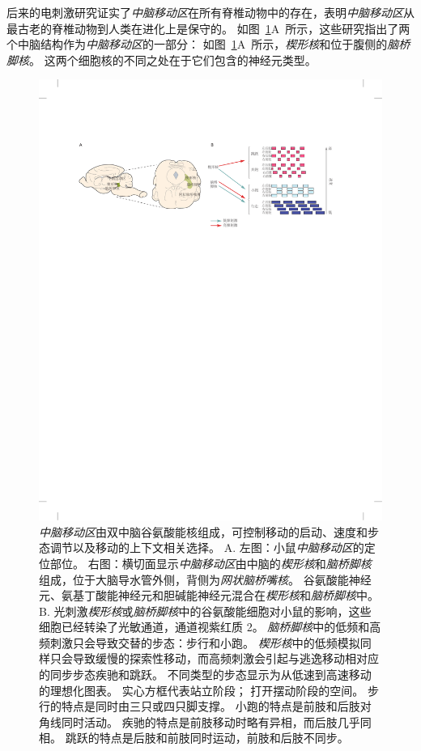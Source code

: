 后来的电刺激研究证实了\textit{中脑移动区}在所有脊椎动物中的存在，表明\textit{中脑移动区}从最古老的脊椎动物到人类在进化上是保守的。
如图~\ref{fig:33_11}A~所示，这些研究指出了两个中脑结构作为\textit{中脑移动区}的一部分：
如图~\ref{fig:33_11}A~所示，\textit{楔形核}和位于腹侧的\textit{脑桥脚核}。
这两个细胞核的不同之处在于它们包含的神经元类型。


\begin{figure}[htbp]
	\centering
	\includegraphics[width=1.0\linewidth]{chap33/fig_33_11}
	\caption{\textit{中脑移动区}由双中脑谷氨酸能核组成，可控制移动的启动、速度和步态调节以及移动的上下文相关选择。
		A. 左图：小鼠\textit{中脑移动区}的定位部位。
		右图：横切面显示\textit{中脑移动区}由中脑的\textit{楔形核}和\textit{脑桥脚核}组成，位于大脑导水管外侧，背侧为\textit{网状脑桥嘴核}。
		谷氨酸能神经元、氨基丁酸能神经元和胆碱能神经元混合在\textit{楔形核}和\textit{脑桥脚核}中。
		B. 光刺激\textit{楔形核}或\textit{脑桥脚核}中的谷氨酸能细胞对小鼠的影响，这些细胞已经转染了光敏通道，通道视紫红质 2。
		\textit{脑桥脚核}中的低频和高频刺激只会导致交替的步态：步行和小跑。
		\textit{楔形核}中的低频模拟同样只会导致缓慢的探索性移动，而高频刺激会引起与逃逸移动相对应的同步步态疾驰和跳跃。
		不同类型的步态显示为从低速到高速移动的理想化图表。
		实心方框代表站立阶段；
		打开摆动阶段的空间。
		步行的特点是同时由三只或四只脚支撑。
		小跑的特点是前肢和后肢对角线同时活动。
		疾驰的特点是前肢移动时略有异相，而后肢几乎同相。
		跳跃的特点是后肢和前肢同时运动，前肢和后肢不同步\cite{caggiano2018midbrain}。}
	\label{fig:33_11}
\end{figure}


